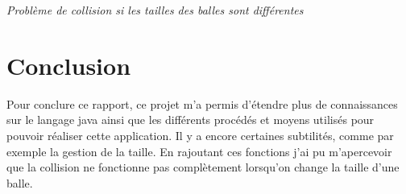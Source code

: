 \documentclass{article}
\begin{document}
\begin{center}
  	\textsl{Problème de collision si les tailles des balles sont différentes}
\end{center}

\section{Conclusion}
Pour conclure ce rapport, ce projet m'a permis d'étendre plus de connaissances sur le langage java ainsi que les différents procédés et moyens utilisés pour pouvoir réaliser cette application. Il y a encore certaines subtilités, comme par exemple la gestion de la taille. En rajoutant ces fonctions j'ai pu m'apercevoir que la collision ne fonctionne pas complètement lorsqu'on change la taille d'une balle. 

\nocite{*}



\end{document}
